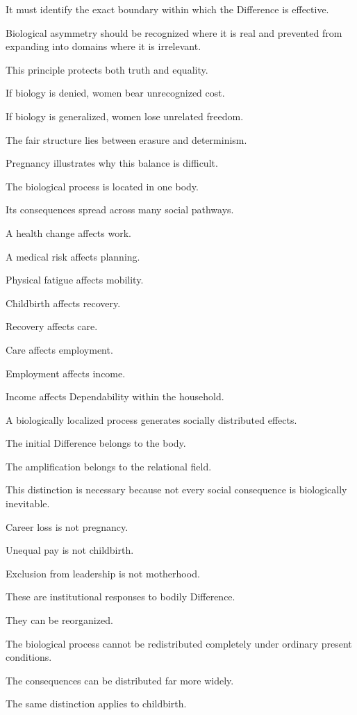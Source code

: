 It must identify the exact boundary within which the Difference is effective.

Biological asymmetry should be recognized where it is real and prevented from expanding into domains where it is irrelevant.

This principle protects both truth and equality.

If biology is denied, women bear unrecognized cost.

If biology is generalized, women lose unrelated freedom.

The fair structure lies between erasure and determinism.

Pregnancy illustrates why this balance is difficult.

The biological process is located in one body.

Its consequences spread across many social pathways.

A health change affects work.

A medical risk affects planning.

Physical fatigue affects mobility.

Childbirth affects recovery.

Recovery affects care.

Care affects employment.

Employment affects income.

Income affects Dependability within the household.

A biologically localized process generates socially distributed effects.

The initial Difference belongs to the body.

The amplification belongs to the relational field.

This distinction is necessary because not every social consequence is biologically inevitable.

Career loss is not pregnancy.

Unequal pay is not childbirth.

Exclusion from leadership is not motherhood.

These are institutional responses to bodily Difference.

They can be reorganized.

The biological process cannot be redistributed completely under ordinary present conditions.

The consequences can be distributed far more widely.

The same distinction applies to childbirth.

